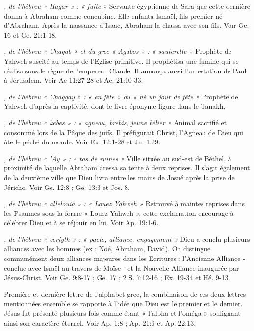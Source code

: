 \begin{multicols}{2}
{\textit{, de l'hébreu « Hagar » : « fuite »}\newline
Servante égyptienne de Sara que cette dernière donna à Abraham comme concubine. Elle enfanta Ismaël, fils premier-né d'Abraham. Après la naissance d'Isaac, Abraham la chassa avec son fils. Voir Ge. 16 et Ge. 21:1-18.

\textit{, de l'hébreu « Chagab » et du grec « Agabos » : « sauterelle »}\newline
Prophète de Yahweh suscité au temps de l'Eglise primitive. Il prophétisa une famine qui se réalisa sous le règne de l'empereur Claude. Il annonça aussi l'arrestation de Paul à Jérusalem. Voir Ac 11:27-28 et Ac. 21:10-33.

\textit{, de l'hébreu « Chaggay » : « en fête » ou « né un jour de fête »}\newline
Prophète de Yahweh d'après la captivité, dont le livre éponyme figure dans le Tanakh.

\textit{, de l'hébreu « kebes » : « agneau, brebis, jeune bélier »}\newline
Animal sacrifié et consommé lors de la Pâque des juifs. Il préfigurait Christ, l'Agneau de Dieu qui ôte le péché du monde. Voir Ex. 12:1-28 et Jn. 1:29.

\textit{, de l'hébreu « 'Ay » : « tas de ruines »}\newline
Ville située au sud-est de Béthel, à proximité de laquelle Abraham dressa sa tente à deux reprises. Il s'agit également de la deuxième ville que Dieu livra entre les mains de Josué après la prise de Jéricho. Voir Ge. 12:8 ; Ge. 13:3 et Jos. 8.

\textit{, de l'hébreu « allelouia » : « Louez Yahweh »}\newline
Retrouvé à maintes reprises dans les Psaumes sous la forme « Louez Yahweh », cette exclamation encourage à célébrer Dieu et à se réjouir en lui. Voir Ap. 19:1-6.

\textit{, de l'hébreu « beriyth » : « pacte, alliance, engagement »}\newline
Dieu a conclu plusieurs alliances avec les hommes (ex : Noé, Abraham, David). On distingue communément deux alliances majeures dans les Ecritures : l'Ancienne Alliance - conclue avec Israël au travers de Moïse - et la Nouvelle Alliance inaugurée par Jésus-Christ. Voir Ge. 9:8-17 ; Ge. 17 ; 2 S. 7:12-16 ; Ex. 19-34 et Hé. 9-13.

\textit{}\newline
Première et dernière lettre de l'alphabet grec, la combinaison de ces deux lettres mentionnées ensemble se rapporte à l'idée que Dieu est le premier et le dernier. Jésus fut présenté plusieurs fois comme étant « l'alpha et l'oméga » soulignant ainsi son caractère éternel. Voir Ap. 1:8 ; Ap. 21:6 et Ap. 22:13.

}
\end{multicols}
